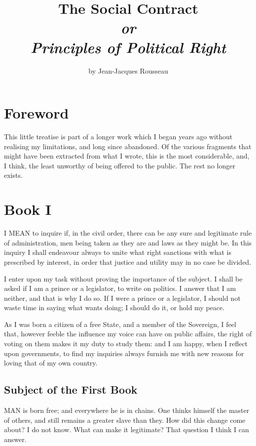 \documentclass[12pt]{book}
\title{\HUGE\bfseries{The Social Contract} \\ \vspace{7mm}
\large\itshape or \\ \vspace{7mm}
\LARGE Principles of Political Right}
\author{\Large by Jean-Jacques Rousseau}
\date{\vspace{-4mm}Translated 1920 by G. D. H. Cole \\
\vfill
\epigraph{\large\itshape Foederis aequas \\ Dicamus leges}{\large Virgil,\textit{ Aeneid} XI}}
\renewcommand\thechapter{{\Roman{chapter}}}
\newcommand{\mychapter}[2]{
\setcounter{chapter}{#1}
    \setcounter{section}{0}
    \chapter*{#2}
    \addcontentsline{toc}{chapter}{#2}
}
\begin{document}
\begin{titlepage}
    \maketitle
\end{titlepage}

\renewcommand*\contentsname{\vspace{-1cm} Table of Contents}
\tableofcontents

\chapter*{Foreword}
This little treatise is part of a longer work which I began years ago without realising my limitations, and long since abandoned. Of the various fragments that might have been extracted from what I wrote, this is the most considerable, and, I think, the least unworthy of being offered to the public. The rest no longer exists.
\fancyhead[RE]{\MakeUppercase{Book \thechapter}}
\titlespacing{\chapter}{0mm}{-2em}{1em}
\mychapter{1}{Book I}

I MEAN to inquire if, in the civil order, there can be any sure and legitimate rule of administration, men being taken as they are and laws as they might be. In this inquiry I shall endeavour always to unite what right sanctions with what is prescribed by interest, in order that justice and utility may in no case be divided.

I enter upon my task without proving the importance of the subject. I shall be asked if I am a prince or a legislator, to write on politics. I answer that I am neither, and that is why I do so. If I were a prince or a legislator, I should not waste time in saying what wants doing; I should do it, or hold my peace.

As I was born a citizen of a free State, and a member of the Sovereign, I feel that, however feeble the influence my voice can have on public affairs, the right of voting on them makes it my duty to study them: and I am happy, when I reflect upon governments, to find my inquiries always furnish me with new reasons for loving that of my own country.
\section{Subject of the First Book}
MAN is born free; and everywhere he is in chains. One thinks himself the master of others, and still remains a greater slave than they. How did this change come about? I do not know. What can make it legitimate? That question I think I can answer.
\end{document}
